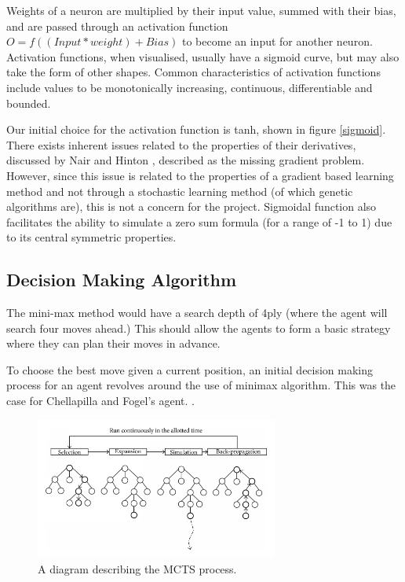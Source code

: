 \documentclass[12pt,a4paper]{article}
\begin{document}
        Weights of a neuron are multiplied by their input value, summed with their bias, and are passed through an activation function $O = f((Input* weight) + Bias)$ to become an input for another neuron. Activation functions, when visualised, usually have a sigmoid curve, but may also take the form of other shapes. Common characteristics of activation functions include values to be monotonically increasing, continuous, differentiable and bounded.

        Our initial choice for the activation function is tanh, shown in figure \ref{sigmoid}. There exists inherent issues related to the properties of their derivatives, discussed by Nair and Hinton \cite{nair_rectified_2010}, described as the missing gradient problem. However, since this issue is related to the properties of a gradient based learning method and not through a stochastic learning method (of which genetic algorithms are), this is not a concern for the project. Sigmoidal function also facilitates the ability to simulate a zero sum formula (for a range of -1 to 1) due to its central symmetric properties.
        
    \subsection{Decision Making Algorithm}

        The mini-max method would have a search depth of 4ply (where the agent will search four moves ahead.) This should allow the agents to form a basic strategy where they can plan their moves in advance. 

        To choose the best move given a current position, an initial decision making process for an agent revolves around the use of minimax algorithm. This was the case for Chellapilla and Fogel's agent. \cite{chellapilla_evolving_1999}. 

        \begin{figure}[!h]
            \centering
            \includegraphics[width=80mm]{montecarlo.png}
            \caption{A diagram describing the MCTS process.}
        \end{figure}
\end{document}
